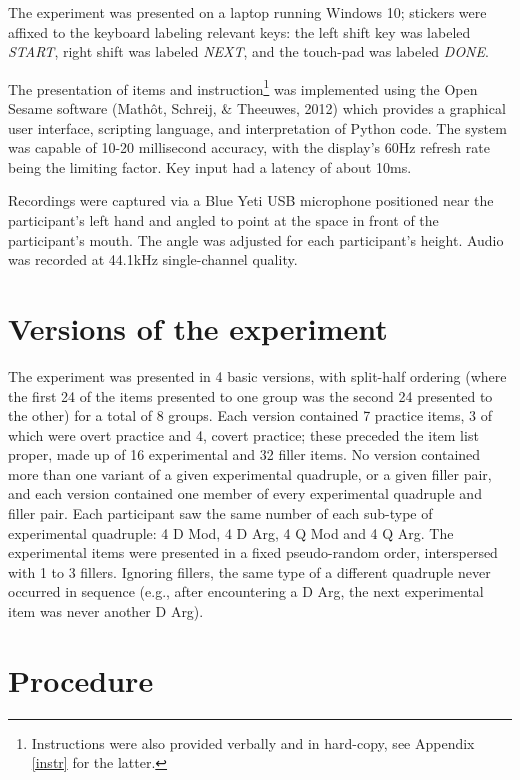 \documentclass[11pt,oneside]{book}
\let\rmarkdownfootnote\footnote%
\def\footnote{\protect\rmarkdownfootnote}
\begin{document}
The experiment was presented on a laptop running Windows 10; stickers were affixed to the keyboard labeling relevant keys: the left shift key was labeled \emph{START}, right shift was labeled \emph{NEXT}, and the touch-pad was labeled \emph{DONE}.

The presentation of items and instruction\footnote{Instructions were also provided verbally and in hard-copy, see Appendix \ref{instr} for the latter.} was implemented using the Open Sesame software (Mathôt, Schreij, \& Theeuwes, 2012) which provides a graphical user interface, scripting language, and interpretation of Python code. The system was capable of 10-20 millisecond accuracy, with the display's 60Hz refresh rate being the limiting factor. Key input had a latency of about 10ms.

Recordings were captured via a Blue Yeti USB microphone positioned near the participant's left hand and angled to point at the space in front of the participant's mouth. The angle was adjusted for each participant's height. Audio was recorded at 44.1kHz single-channel quality.

\hypertarget{versions-of-the-experiment}{%
\section{Versions of the experiment}\label{versions-of-the-experiment}}

The experiment was presented in 4 basic versions, with split-half ordering (where the first 24 of the items presented to one group was the second 24 presented to the other) for a total of 8 groups. Each version contained 7 practice items, 3 of which were overt practice and 4, covert practice; these preceded the item list proper, made up of 16 experimental and 32 filler items. No version contained more than one variant of a given experimental quadruple, or a given filler pair, and each version contained one member of every experimental quadruple and filler pair. Each participant saw the same number of each sub-type of experimental quadruple: 4 D Mod, 4 D Arg, 4 Q Mod and 4 Q Arg. The experimental items were presented in a fixed pseudo-random order, interspersed with 1 to 3 fillers. Ignoring fillers, the same type of a different quadruple never occurred in sequence (e.g., after encountering a D Arg, the next experimental item was never another D Arg).

\hypertarget{procedure}{%
\section{Procedure}\label{procedure}}
\end{document}
